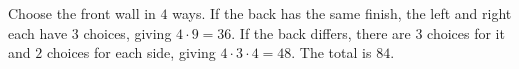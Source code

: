 Choose the front wall in $4$ ways. If the back has the same finish, the left and right each have $3$ choices, giving $4\cdot9=36$. If the back differs, there are $3$ choices for it and $2$ choices for each side, giving $4\cdot3\cdot4=48$. The total is $\boxed{84}$.
